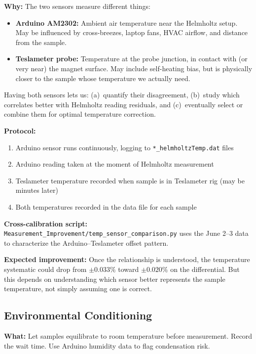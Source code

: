 \documentclass[11pt,letterpaper]{article}
\begin{document}
\textbf{Why:} The two sensors measure different things:
\begin{itemize}[nosep]
  \item \textbf{Arduino AM2302:} Ambient air temperature near the Helmholtz
    setup. May be influenced by cross-breezes, laptop fans, HVAC airflow, and
    distance from the sample.
  \item \textbf{Teslameter probe:} Temperature at the probe junction, in contact
    with (or very near) the magnet surface. May include self-heating bias, but is
    physically closer to the sample whose temperature we actually need.
\end{itemize}

Having both sensors lets us: (a)~quantify their disagreement, (b)~study which
correlates better with Helmholtz reading residuals, and (c)~eventually select or
combine them for optimal temperature correction.

\textbf{Protocol:}
\begin{enumerate}[nosep]
  \item Arduino sensor runs continuously, logging to
    \texttt{*\_helmholtzTemp.dat} files
  \item Arduino reading taken at the moment of Helmholtz measurement
  \item Teslameter temperature recorded when sample is in Teslameter rig (may be
    minutes later)
  \item Both temperatures recorded in the data file for each sample
\end{enumerate}

\textbf{Cross-calibration script:}
\texttt{Measurement\_Improvement/temp\_sensor\_comparison.py} uses the June 2--3
data to characterize the Arduino--Teslameter offset pattern.

\textbf{Expected improvement:} Once the relationship is understood, the
temperature systematic could drop from $\pm 0.033\%$ toward $\pm 0.020\%$ on the
differential. But this depends on understanding which sensor better represents
the sample temperature, not simply assuming one is correct.


\subsection{Environmental Conditioning}
\label{sec:imp-enviro}

\textbf{What:} Let samples equilibrate to room temperature before measurement.
Record the wait time. Use Arduino humidity data to flag condensation risk.
\end{document}
